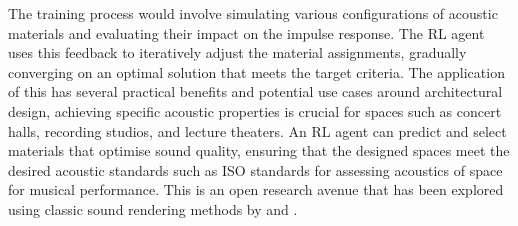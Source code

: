 The training process would involve simulating various configurations of acoustic materials and evaluating their impact on the impulse response. The RL agent uses this feedback to iteratively adjust the material assignments, gradually converging on an optimal solution that meets the target criteria.
The application of this has several practical benefits and potential use cases around architectural design, achieving specific acoustic properties is crucial for spaces such as concert halls, recording studios, and lecture theaters. An RL agent can predict and select materials that optimise sound quality, ensuring that the designed spaces meet the desired acoustic standards such as ISO standards for assessing acoustics of space for musical performance. This is an open research avenue that has been explored using classic sound rendering methods by \cite{funkhouser2004beam} and \cite{heimes2019real}.


